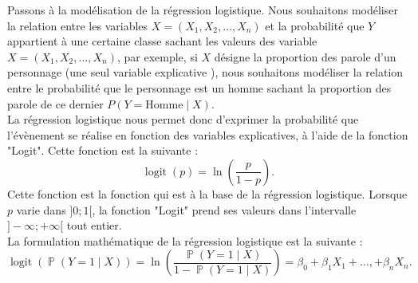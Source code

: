 \documentclass[12pt,a4paper,openany]{article}
\theoremstyle{break}
\newtheorem *{app}{ Application}[section]
\newtheorem *{prf}{ Preuve:}
\DeclareMathOperator{\logit}{logit}
\DeclareMathOperator{\Proba}{\mathbb{P}}
\begin{document}
Passons à la modélisation de la régression logistique. Nous souhaitons modéliser la relation entre les variables $X = (X_1, X_2, \dots, X_n )$ et la probabilité que $Y$ appartient à une certaine classe sachant les valeurs des variable $X = (X_1, X_2, \dots, X_n )$, par exemple, si $X$ désigne la proportion des parole d'un personnage (une seul variable explicative ), nous souhaitons modéliser la relation entre le probabilité que le personnage est un homme sachant la proportion des parole de ce dernier $P(Y = \text{Homme} \mid X)$.\\
La régression logistique nous permet donc d'exprimer la probabilité que l'évènement 
se réalise en fonction des variables explicatives, à l'aide de la fonction "Logit". Cette fonction 
est la suivante : 
\begin{equation*}
    \logit(p) = \ln \left (\frac{p}{1-p} \right ).
\end{equation*}
Cette fonction est la fonction qui est à la base de la régression logistique. Lorsque $p$ varie dans
$]0;1[$, la fonction "Logit" prend ses valeurs dans l'intervalle $]-\infty ;+\infty[$ tout entier. \\
La formulation mathématique de la régression logistique est la suivante : 
\begin{equation*}
    \logit \left (\Proba(Y = 1 \mid X) \right ) = \ln \left (\frac{\Proba(Y = 1 \mid X)}{1-\Proba(Y = 1 \mid X)} \right) = \beta_0 + \beta_{1} X_{1} + \dots, + \beta_{n}X_n.
\end{equation*}







\end{document}
